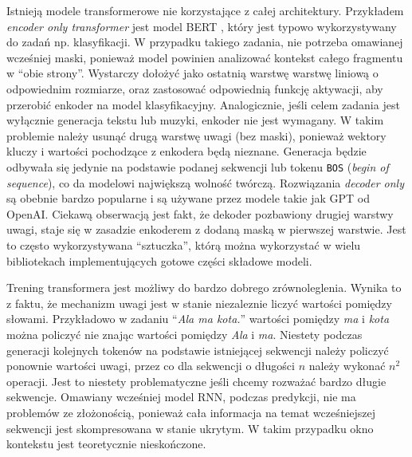 \documentclass[data-science]{agh-wi} %
\begin{document}
Istnieją modele transformerowe nie korzystające z całej architektury. Przykładem \textit{encoder only transformer} jest model BERT \cite{bert}, który jest typowo wykorzystywany do zadań np. klasyfikacji. W przypadku takiego zadania, nie potrzeba omawianej wcześniej maski, ponieważ model powinien analizować kontekst całego fragmentu w ``obie strony''. Wystarczy dołożyć jako ostatnią warstwę warstwę liniową o odpowiednim rozmiarze, oraz zastosować odpowiednią funkcję aktywacji, aby przerobić enkoder na model klasyfikacyjny.
Analogicznie, jeśli celem zadania jest wyłącznie generacja tekstu lub muzyki, enkoder nie jest wymagany. W takim problemie należy usunąć drugą warstwę uwagi (bez maski), ponieważ wektory kluczy i wartości pochodzące z enkodera będą nieznane. Generacja będzie odbywała się jedynie na podstawie podanej sekwencji lub tokenu \texttt{BOS} (\textit{begin of sequence}), co da modelowi największą wolność twórczą. Rozwiązania \textit{decoder only} są obebnie bardzo popularne i są używane przez modele takie jak GPT od OpenAI. Ciekawą obserwacją jest fakt, że dekoder pozbawiony drugiej warstwy uwagi, staje się w zasadzie enkoderem z dodaną maską w pierwszej warstwie. Jest to często wykorzystywana ``sztuczka'', którą można wykorzystać w wielu bibliotekach implementujących gotowe części składowe modeli.

Trening transformera jest możliwy do bardzo dobrego zrównoleglenia. Wynika to z faktu, że mechanizm uwagi jest w stanie niezaleznie liczyć wartości pomiędzy słowami. Przykładowo w zadaniu ``\textit{Ala ma kota.}'' wartości pomiędzy \textit{ma} i \textit{kota} można policzyć nie znając wartości pomiędzy \textit{Ala} i \textit{ma}. Niestety podczas generacji kolejnych tokenów na podstawie istniejącej sekwencji należy policzyć ponownie wartości uwagi, przez co dla sekwencji o długości $n$ należy wykonać $n^2$ operacji. Jest to niestety problematyczne jeśli chcemy rozważać bardzo długie sekwencje. Omawiany wcześniej model RNN, podczas predykcji, nie ma problemów ze złożonością, ponieważ cała informacja na temat wcześniejszej sekwencji jest skompresowana w stanie ukrytym. W takim przypadku okno kontekstu jest teoretycznie nieskończone.

\end{document}

